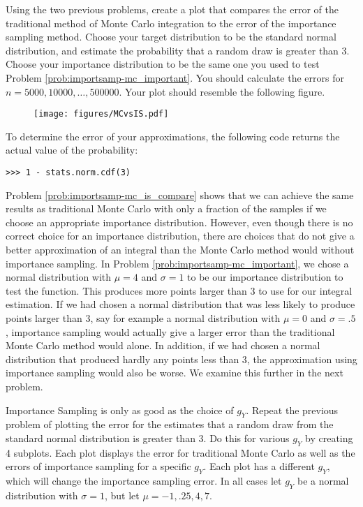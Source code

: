 \begin{problem} \label{prob:importsamp-mc_is_compare}
Using the two previous problems, create a plot that compares the error of the traditional method of Monte Carlo integration to the error of the importance sampling method.
Choose your target distribution to be the standard normal distribution, and estimate the probability that a random draw is greater than $3$.
Choose your importance distribution to be the same one you used to test Problem \ref{prob:importsamp-mc_important}.
You should calculate the errors for $n = 5000, 10000, \ldots , 500000$.
Your plot should resemble the following figure.

\begin{figure}[H]
\texttt{[image: figures/MCvsIS.pdf]}
\label{fig:compare}
\end{figure}

To determine the error of your approximations, the following code returns the actual value of the probability:
\begin{lstlisting}
>>> 1 - stats.norm.cdf(3)
\end{lstlisting}
\end{problem}

Problem \ref{prob:importsamp-mc_is_compare} shows that we can achieve the same results as traditional Monte Carlo with only a fraction of the samples if we choose an appropriate importance distribution.
However, even though there is no correct choice for an importance distribution, there are choices that do not give a better approximation of an integral than the Monte Carlo method would without importance sampling.
In Problem \ref{prob:importsamp-mc_important}, we chose a normal distribution with $\mu = 4$ and $\sigma = 1$ to be our importance distribution to test the function.
This produces more points larger than $3$ to use for our integral estimation.
If we had chosen a normal distribution that was less likely to produce points larger than $3$, say for example a normal distribution with $\mu = 0$ and $\sigma = .5$, importance sampling would actually give a larger error than the traditional Monte Carlo method would alone.
In addition, if we had chosen a normal distribution that produced hardly any points less than $3$, the approximation using importance sampling would also be worse.
We examine this further in the next problem.

\begin{problem} \label{prob:other_plots}
Importance Sampling is only as good as the choice of $g_Y$.
Repeat the previous problem of plotting the error for the estimates that a random draw from the standard normal distribution is greater than 3.
Do this for various $g_Y$ by creating 4 subplots.
Each plot displays the error for traditional Monte Carlo as well as the errors of importance sampling for a specific $g_Y$.
Each plot has a different $g_Y$, which will change the importance sampling error.
In all cases let $g_Y$ be a normal distribution with $\sigma =1$, but let $\mu = -1, .25, 4, 7$.
\end{problem}

